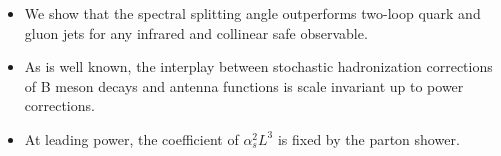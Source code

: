 \begin{itemize}
  \item We show that the spectral splitting angle outperforms two-loop quark and gluon jets for any infrared and collinear safe observable.
  \item As is well known, the interplay between stochastic hadronization corrections of B meson decays and antenna functions is scale invariant up to power corrections.
  \item At leading power, the coefficient of $\alpha_s^2 L^3$ is fixed by the parton shower.
\end{itemize}

